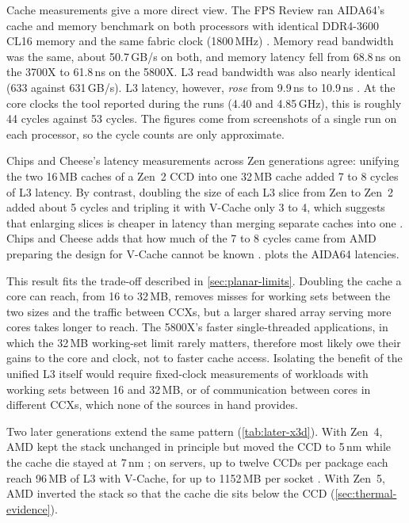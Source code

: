 Cache measurements give a more direct view. The FPS Review ran AIDA64's cache and memory benchmark on both processors with identical DDR4-3600 CL16 memory and the same fabric clock (1800\,MHz) \cite{justiceAMDRyzen72021}. Memory read bandwidth was the same, about 50.7\,GB/s on both, and memory latency fell from 68.8\,ns on the 3700X to 61.8\,ns on the 5800X. L3 read bandwidth was also nearly identical (633 against 631\,GB/s). L3 latency, however, \emph{rose} from 9.9\,ns to 10.9\,ns \cite{justiceAMDRyzen72021}. At the core clocks the tool reported during the runs (4.40 and 4.85\,GHz), this is roughly 44 cycles against 53 cycles. The figures come from screenshots of a single run on each processor, so the cycle counts are only approximate.

Chips and Cheese's latency measurements across Zen generations agree: unifying the two 16\,MB caches of a Zen~2 CCD into one 32\,MB cache added 7 to 8 cycles of L3 latency. By contrast, doubling the size of each L3 slice from Zen to Zen~2 added about 5 cycles and tripling it with V-Cache only 3 to 4, which suggests that enlarging slices is cheaper in latency than merging separate caches into one \cite{cozmaDeepDivingZen2022}. Chips and Cheese adds that how much of the 7 to 8 cycles came from AMD preparing the design for V-Cache cannot be known \cite{cozmaDeepDivingZen2022}.  plots the AIDA64 latencies.




This result fits the trade-off described in \cref{sec:planar-limits}. Doubling the cache a core can reach, from 16 to 32\,MB, removes misses for working sets between the two sizes and the traffic between CCXs, but a larger shared array serving more cores takes longer to reach. The 5800X's faster single-threaded applications, in which the 32\,MB working-set limit rarely matters, therefore most likely owe their gains to the core and clock, not to faster cache access. Isolating the benefit of the unified L3 itself would require fixed-clock measurements of workloads with working sets between 16 and 32\,MB, or of communication between cores in different CCXs, which none of the sources in hand provides.

Two later generations extend the same pattern (\cref{tab:later-x3d}). With Zen~4, AMD kept the stack unchanged in principle but moved the CCD to 5\,nm while the cache die stayed at 7\,nm \cite{alam2ndGeneration3D2024}; on servers, up to twelve CCDs per package each reach 96\,MB of L3 with V-Cache, for up to 1152\,MB per socket \cite{advancedmicrodevicesinc.4thGenAMD2023}. With Zen~5, AMD inverted the stack so that the cache die sits below the CCD (\cref{sec:thermal-evidence}).

